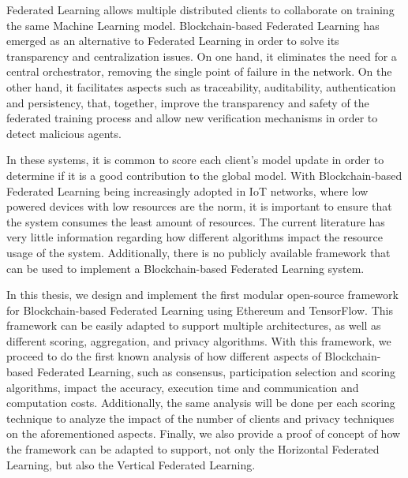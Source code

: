 Federated Learning allows multiple distributed clients to collaborate on training the same Machine Learning model. Blockchain-based Federated Learning has emerged as an alternative to Federated Learning in order to solve its transparency and centralization issues. On one hand, it eliminates the need for a central orchestrator, removing the single point of failure in the network. On the other hand, it facilitates aspects such as traceability, auditability, authentication and persistency, that, together, improve the transparency and safety of the federated training process and allow new verification mechanisms in order to detect malicious agents.

In these systems, it is common to score each client's model update in order to determine if it is a good contribution to the global model. With Blockchain-based Federated Learning being increasingly adopted in IoT networks, where low powered devices with low resources are the norm, it is important to ensure that the system consumes the least amount of resources. The current literature has very little information regarding how different algorithms impact the resource usage of the system. Additionally, there is no publicly available framework that can be used to implement a Blockchain-based Federated Learning system.

In this thesis, we design and implement the first modular open-source framework for Blockchain-based Federated Learning using Ethereum and TensorFlow. This framework can be easily adapted to support multiple architectures, as well as different scoring, aggregation, and privacy algorithms. With this framework, we proceed to do the first known analysis of how different aspects of Blockchain-based Federated Learning, such as consensus, participation selection and scoring algorithms, impact the accuracy, execution time and communication and computation costs. Additionally, the same analysis will be done per each scoring technique to analyze the impact of the number of clients and privacy techniques on the aforementioned aspects. Finally, we also provide a proof of concept of how the framework can be adapted to support, not only the Horizontal Federated Learning, but also the Vertical Federated Learning.